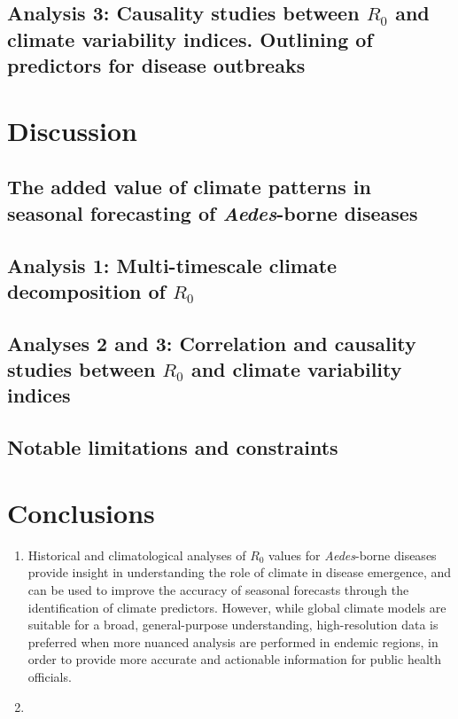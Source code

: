 \documentclass[article,10pt,twocolumn]{wlscirep}
\begin{document}
\subsection{Analysis 3: Causality studies between $R_0$ and climate variability indices. Outlining of predictors for disease outbreaks} \label{sec-results-3}

\section{Discussion} \label{sec-discussion}

\subsection{The added value of climate patterns in seasonal forecasting of \textit{Aedes}-borne diseases} \label{sec-discussion-added-value}

\subsection{Analysis 1: Multi-timescale climate decomposition of $R_0$} \label{sec-discussion-analysis-1}

\subsection{Analyses 2 and 3: Correlation and causality studies between $R_0$ and climate variability indices} \label{sec-discussion-analysis-2-3}

\subsection{Notable limitations and constraints} \label{sec-discussion-limitations}

\section{Conclusions} \label{sec-conclusions}

\begin{enumerate}
  \item Historical and climatological analyses of $R_0$ values for \textit{Aedes}-borne diseases provide insight in understanding the role of climate in disease emergence, and can be used to improve the accuracy of seasonal forecasts through the identification of climate predictors. However, while global climate models are suitable for a broad, general-purpose understanding, high-resolution data is preferred when more nuanced analysis are performed in endemic regions, in order to provide more accurate and actionable information for public health officials.
  \item
\end{enumerate}
\end{document}
